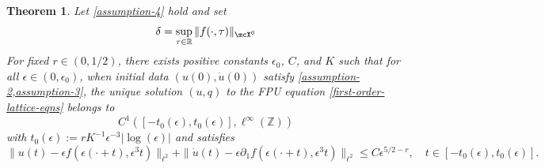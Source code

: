 \documentclass[oneside,reqno]{amsart}
\newcommand{\R}{\mathbb{R}}
\newtheorem{theorem}{Theorem}[section]
\begin{document}
\begin{theorem}\label{thm:meta-stable}
	Let \cref{assumption-4} hold and set 
	\begin{equation*}
		\delta =\sup_{\tau\in\R}\|f(\cdot,\tau)\|_{\mcX^6}
	\end{equation*}
	For fixed \(r\in(0,1/2)\), there exists positive constants \(\epsilon_0\), \(C\), and \(K\) such that for all \(\epsilon \in(0,\epsilon_0)\), when initial data \((u(0), \dot u(0))\) satisfy \cref{assumption-2,assumption-3}, the unique solution \((u,q)\) to the FPU equation \cref{first-order-lattice-eqns} belongs to 
	\begin{equation*}
		C^1([-t_0(\epsilon), t_0(\epsilon)], \ell^\infty(\mathbb Z))
	\end{equation*}
	with \(t_0(\epsilon):= r K^{-1} \epsilon^{-3} | \log (\epsilon) | \) and satisfies
	\begin{equation*}
		 \| u(t) - \epsilon f(\epsilon(\cdot+t), \epsilon^3 t) \|_{\ell^2} + \| \dot u(t) - \epsilon \partial_1 f(\epsilon (\cdot +t),\epsilon^3t)  \|_{\ell^2} \leq C \epsilon^{5/2 - r}, \quad t\in[-t_0(\epsilon), t_0(\epsilon)].
	\end{equation*}
\end{theorem}
\end{document}
